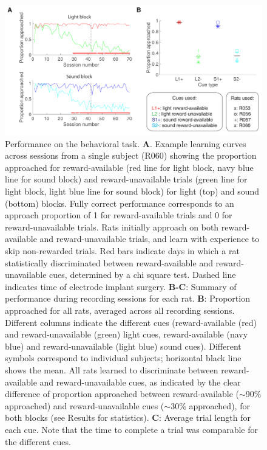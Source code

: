 \documentclass[11pt]{article}
\newcommand{\bsf}[1]{\textbf{#1}}
\begin{document}
 \begin{figure}[ht!]
\centering
\includegraphics[width=\textwidth]{Fig 3 - Behavioral results.pdf}
\caption{Performance on the behavioral task. \bsf{A}. Example learning
  curves across sessions from a single subject (R060) showing the
  proportion approached for reward-available (red line for light
  block, navy blue line for sound block) and reward-unavailable trials
  (green line for light block, light blue line for sound block) for
  light (top) and sound (bottom) blocks. Fully correct performance
  corresponds to an approach proportion of 1 for reward-available
  trials and 0 for reward-unavailable trials. Rats initially approach
  on both reward-available and reward-unavailable trials, and learn
  with experience to skip non-rewarded trials. Red bars indicate days
  in which a rat statistically discriminated between reward-available
  and reward-unavailable cues, determined by a chi square test. Dashed
  line indicates time of electrode implant surgery. \bsf{B-C}: Summary
  of performance during recording sessions for each rat. \bsf{B}:
  Proportion approached for all rats, averaged across all recording
  sessions. Different columns indicate the different cues
  (reward-available (red) and reward-unavailable (green) light cues,
  reward-available (navy blue) and reward-unavailable (light blue)
  sound cues). Different symbols correspond to individual subjects;
  horizontal black line shows the mean. All rats learned to
  discriminate between reward-available and reward-unavailable cues,
  as indicated by the clear difference of proportion approached
  between reward-available ($\sim$90\% approached) and
  reward-unavailable cues ($\sim$30\% approached), for both blocks
  (see Results for statistics). \bsf{C}: Average trial length for each
  cue. Note that the time to complete a trial was comparable for the
  different cues.}
\label{fig:behav}
\end{figure} \clearpage
\end{document}
